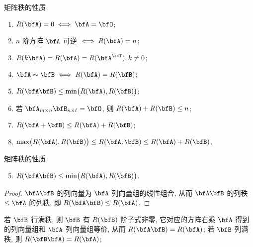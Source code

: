 \begin{frame}{矩阵秩的性质}
	\onslide<+->
	\begin{proposition}
		\begin{enumerate}
			\item $R(\bfA)=0\iff \bfA=\bfO$;
			\item $n$ 阶方阵 $\bfA$ 可逆 $\iff R(\bfA)=n$;
			\item $R(k\bfA)=R(\bfA)=R(\bfA^\rmT), k\neq 0$;
			\item $\bfA\sim\bfB\iff R(\bfA)=R(\bfB)$;
			\item $R(\bfA\bfB)\le \min\bigl(R(\bfA),R(\bfB)\bigr)$;
			\item 若 $\bfA_{m\times n}\bfB_{n\times\ell}=\bfO$, 则 $R(\bfA)+R(\bfB)\le n$;
			\item $R(\bfA+\bfB)\le R(\bfA)+R(\bfB)$;
			\item $\max\bigl(R(\bfA),R(\bfB)\bigr)\le R(\bfA,\bfB)\le R(\bfA)+R(\bfB)$.
		\end{enumerate}
	\end{proposition}
\end{frame}


\begin{frame}{矩阵秩的性质}
	\onslide<+->
	\begin{proposition}
		\begin{enumerate}
			\setcounter{enumi}{4}
			\item $R(\bfA\bfB)\le \min\bigl(R(\bfA),R(\bfB)\bigr)$.
		\end{enumerate}
	\end{proposition}
	\onslide<+->
	\begin{proof}
		$\bfA\bfB$ 的列向量为 $\bfA$ 列向量组的线性组合, 从而 $\bfA\bfB$ 的列秩 $\le \bfA$ 的列秩, 即 $R(\bfA\bfB)\le R(\bfA)$.
		\onslide<+->{%
			于是
			\[R(\bfA\bfB)=R(\bfB^\rmT\bfA^\rmT)\le R(\bfB^\rmT)=R(\bfB).\qedhere\]
		}
		\vspace{-\baselineskip}
	\end{proof}
	\onslide<+->
	若 $\bfB$ 行满秩, 则 $\bfB$ 有 $R(\bfB)$ 阶子式非零, 它对应的方阵右乘 $\bfA$ 得到的列向量组和 $\bfA$ 列向量组等价, 从而 $R(\bfA\bfB)=R(\bfA)$;
	\onslide<+->
	若 $\bfB$ 列满秩, 则 $R(\bfB\bfA)=R(\bfA)$;
\end{frame}


